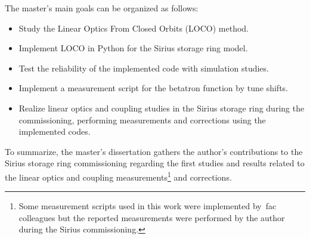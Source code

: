 The master's main goals can be organized as follows:
\begin{itemize}
    \item Study the Linear Optics From Closed Orbits (LOCO) method.
    \item Implement LOCO in Python for the Sirius storage ring model.
    \item Test the reliability of the implemented code with simulation studies.
    \item Implement a measurement script for the betatron function by tune shifts.
    \item Realize linear optics and coupling studies in the Sirius storage ring during the commissioning, performing measurements and corrections using the implemented codes.
\end{itemize}

To summarize, the master's dissertation gathers the author's contributions to the Sirius storage ring commissioning regarding the first studies and results related to the linear optics and coupling measurements\footnote{Some measurement scripts used in this work were implemented by~\gls{fac} colleagues but the reported measurements were performed by the author during the Sirius commissioning.} and corrections. 










